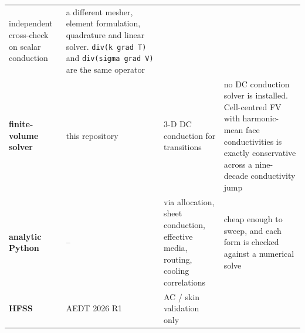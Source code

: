 \documentclass[10pt,]{article}
\begin{document}
\begin{longtable}[]{@{}llll@{}}
\begin{minipage}[t]{0.22\columnwidth}
independent cross-check on scalar conduction\strut
\end{minipage} & \begin{minipage}[t]{0.22\columnwidth}\raggedright
a different mesher, element formulation, quadrature and linear solver.
\texttt{div(k\ grad\ T)} and \texttt{div(sigma\ grad\ V)} are the same
operator\strut
\end{minipage}\tabularnewline
\begin{minipage}[t]{0.22\columnwidth}\raggedright
\textbf{finite-volume solver}\strut
\end{minipage} & \begin{minipage}[t]{0.22\columnwidth}\raggedright
this repository\strut
\end{minipage} & \begin{minipage}[t]{0.22\columnwidth}\raggedright
3-D DC conduction for transitions\strut
\end{minipage} & \begin{minipage}[t]{0.22\columnwidth}\raggedright
no DC conduction solver is installed. Cell-centred FV with harmonic-mean
face conductivities is exactly conservative across a nine-decade
conductivity jump\strut
\end{minipage}\tabularnewline
\begin{minipage}[t]{0.22\columnwidth}\raggedright
\textbf{analytic Python}\strut
\end{minipage} & \begin{minipage}[t]{0.22\columnwidth}\raggedright
--\strut
\end{minipage} & \begin{minipage}[t]{0.22\columnwidth}\raggedright
via allocation, sheet conduction, effective media, routing, cooling
correlations\strut
\end{minipage} & \begin{minipage}[t]{0.22\columnwidth}\raggedright
cheap enough to sweep, and each form is checked against a numerical
solve\strut
\end{minipage}\tabularnewline
\begin{minipage}[t]{0.22\columnwidth}\raggedright
\textbf{HFSS}\strut
\end{minipage} & \begin{minipage}[t]{0.22\columnwidth}\raggedright
AEDT 2026 R1\strut
\end{minipage} & \begin{minipage}[t]{0.22\columnwidth}\raggedright
AC / skin validation only\strut
\end{minipage} & \begin{minipage}[t]{0.22\columnwidth}\raggedright

\end{minipage}
\end{longtable}
\end{document}
